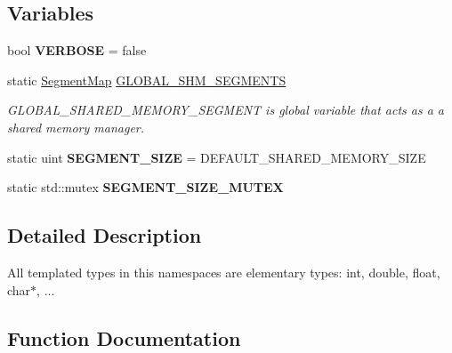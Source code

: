 \subsection*{Variables}
\begin{DoxyCompactItemize}
\item 
bool {\bfseries V\+E\+R\+B\+O\+SE} = false\hypertarget{namespaceshared__memory_adb7d7158652e09188fea583e05949bb5}{}\label{namespaceshared__memory_adb7d7158652e09188fea583e05949bb5}

\item 
static \hyperlink{namespaceshared__memory_a9aeebdfb6185497cac7c093cf3d765c5}{Segment\+Map} \hyperlink{namespaceshared__memory_ad1f78482aa062e165f37fd49e2e8f539}{G\+L\+O\+B\+A\+L\+\_\+\+S\+H\+M\+\_\+\+S\+E\+G\+M\+E\+N\+TS}
\begin{DoxyCompactList}\small\item\em G\+L\+O\+B\+A\+L\+\_\+\+S\+H\+A\+R\+E\+D\+\_\+\+M\+E\+M\+O\+R\+Y\+\_\+\+S\+E\+G\+M\+E\+NT is global variable that acts as a a shared memory manager. \end{DoxyCompactList}\item 
static uint {\bfseries S\+E\+G\+M\+E\+N\+T\+\_\+\+S\+I\+ZE} = D\+E\+F\+A\+U\+L\+T\+\_\+\+S\+H\+A\+R\+E\+D\+\_\+\+M\+E\+M\+O\+R\+Y\+\_\+\+S\+I\+ZE\hypertarget{namespaceshared__memory_a1aa02b0b88f0045c3711029f882d80fa}{}\label{namespaceshared__memory_a1aa02b0b88f0045c3711029f882d80fa}

\item 
static std\+::mutex {\bfseries S\+E\+G\+M\+E\+N\+T\+\_\+\+S\+I\+Z\+E\+\_\+\+M\+U\+T\+EX}\hypertarget{namespaceshared__memory_a5c687b65860cde45c62305fbb7a19e71}{}\label{namespaceshared__memory_a5c687b65860cde45c62305fbb7a19e71}

\end{DoxyCompactItemize}


\subsection{Detailed Description}
All templated types in this namespaces are elementary types\+: int, double, float, char$\ast$, ... 

\subsection{Function Documentation}
